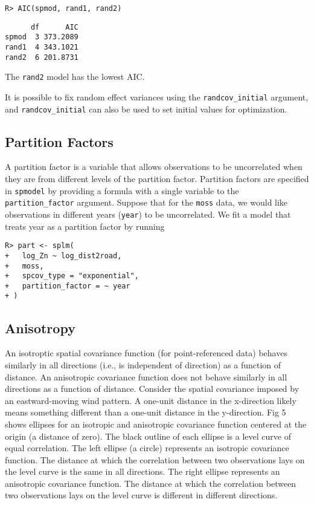 \documentclass[10pt,letterpaper]{article}
\begin{document}
\begin{verbatim}
R> AIC(spmod, rand1, rand2)
\end{verbatim}

\begin{verbatim}
      df      AIC
spmod  3 373.2089
rand1  4 343.1021
rand2  6 201.8731
\end{verbatim}

\noindent The \texttt{rand2} model has the lowest AIC.

It is possible to fix random effect variances using the
\texttt{randcov\_initial} argument, and \texttt{randcov\_initial} can
also be used to set initial values for optimization.

\hypertarget{partition-factors}{%
\subsection{Partition Factors}\label{partition-factors}}

A partition factor is a variable that allows observations to be
uncorrelated when they are from different levels of the partition
factor. Partition factors are specified in \texttt{spmodel} by providing
a formula with a single variable to the \texttt{partition\_factor}
argument. Suppose that for the \texttt{moss} data, we would like
observations in different years (\texttt{year}) to be uncorrelated. We
fit a model that treats year as a partition factor by running

\begin{verbatim}
R> part <- splm(
+   log_Zn ~ log_dist2road,
+   moss,
+   spcov_type = "exponential",
+   partition_factor = ~ year
+ )
\end{verbatim}

\hypertarget{sec:anisotropy}{%
\subsection{Anisotropy}\label{sec:anisotropy}}

An isotroptic spatial covariance function (for point-referenced data)
behaves similarly in all directions (i.e., is independent of direction)
as a function of distance. An anisotropic covariance function does not
behave similarly in all directions as a function of distance. Consider
the spatial covariance imposed by an eastward-moving wind pattern. A
one-unit distance in the x-direction likely means something different
than a one-unit distance in the y-direction. Fig 5 shows ellipses for an
isotropic and anisotropic covariance function centered at the origin (a
distance of zero). The black outline of each ellipse is a level curve of
equal correlation. The left ellipse (a circle) represents an isotropic
covariance function. The distance at which the correlation between two
observations lays on the level curve is the same in all directions. The
right ellipse represents an anisotropic covariance function. The
distance at which the correlation between two observations lays on the
level curve is different in different directions.
\end{document}
